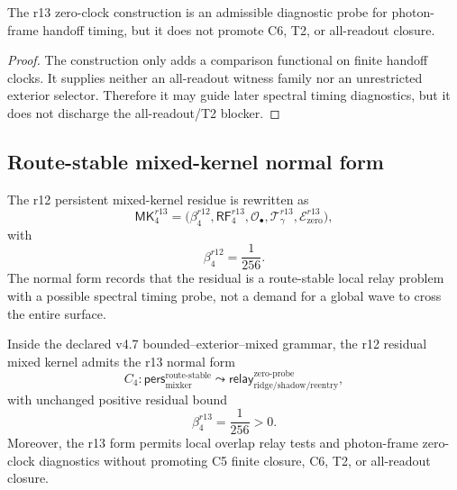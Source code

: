 \begin{proposition}
\label{prop:v470-r13-zero-connection-probe-not-lift}
The r13 zero-clock construction is an admissible diagnostic probe for photon-frame
handoff timing, but it does not promote C6, T2, or all-readout closure.
\end{proposition}

\begin{proof}
The construction only adds a comparison functional on finite handoff clocks.
It supplies neither an all-readout witness family nor an unrestricted exterior
selector.  Therefore it may guide later spectral timing diagnostics, but it does
not discharge the all-readout/T2 blocker.
\end{proof}

\subsection{Route-stable mixed-kernel normal form}
\label{subsec:v470-r13-route-stable-mixed-kernel-normal-form}

\begin{definition}
\label{def:v470-r13-mixed-kernel-normal-form}
The r12 persistent mixed-kernel residue is rewritten as
\[
\mathsf{MK}_{4}^{r13}
=
\bigl(
\beta_4^{r12},
\mathsf{RF}_{4}^{r13},
\mathcal O_{\bullet},
\mathcal T_{\gamma}^{r13},
\mathcal E_{\mathrm{zero}}^{r13}
\bigr),
\]
with
\[
\beta_4^{r12}=\frac1{256}.
\]
The normal form records that the residual is a route-stable local relay problem
with a possible spectral timing probe, not a demand for a global wave to cross
the entire surface.
\end{definition}

\begin{theorem}
\label{thm:v470-r13-mixed-kernel-normal-form-theorem}
Inside the declared v4.7 bounded--exterior--mixed grammar, the r12 residual
mixed kernel admits the r13 normal form
\[
C_4:
\mathsf{pers}_{\mathrm{mixker}}^{\mathrm{route\mbox{-}stable}}
\leadsto
\mathsf{relay}_{\mathrm{ridge/shadow/reentry}}^{\mathrm{zero\mbox{-}probe}},
\]
with unchanged positive residual bound
\[
\beta_4^{r13}=\frac1{256}>0.
\]
Moreover, the r13 form permits local overlap relay tests and photon-frame
zero-clock diagnostics without promoting C5 finite closure, C6, T2, or all-readout
closure.
\end{theorem}

